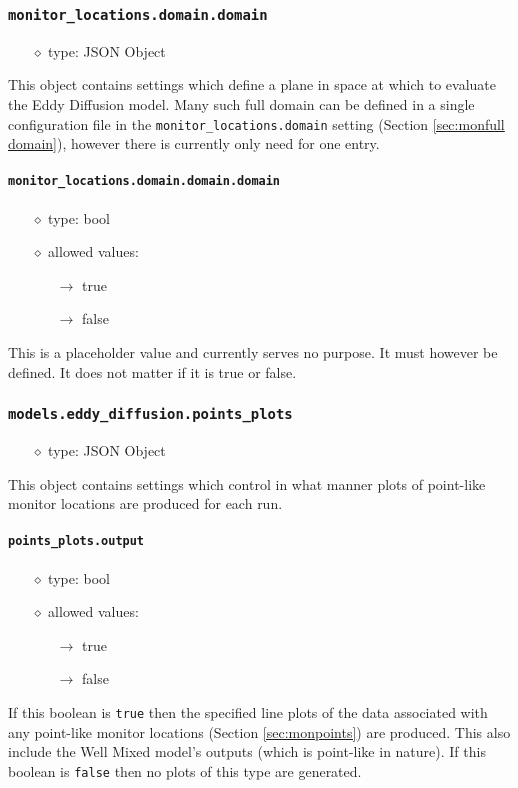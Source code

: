 \documentclass[]{article}
\def\code#1{\texttt{#1}}
\begin{document}
\subsubsection{\code{monitor\_locations.domain.domain}}
\begin{itemize}
    \item[$\diamond$] type: JSON Object 
\end{itemize}
This object contains settings which define a plane in space at which to evaluate
the Eddy Diffusion model. Many such full domain can be defined in a single
configuration file in the \code{monitor\_locations.domain} setting (Section
\ref{sec:monfull domain}), however there is currently only need for one entry.


\paragraph{\code{monitor\_locations.domain.domain.domain}}
\begin{itemize}
    \item[$\diamond$] type: bool 
    \item[$\diamond$] allowed values:
    \begin{itemize}
        \item[$\rightarrow$] true
        \item[$\rightarrow$] false
    \end{itemize}
\end{itemize}
This is a placeholder value and currently serves no purpose. It must however be
defined. It does not matter if it is true or false.

\subsubsection{\code{models.eddy\_diffusion.points\_plots}}
\begin{itemize}
    \item[$\diamond$] type: JSON Object 
\end{itemize}
This object contains settings which control in what manner plots of point-like
monitor locations are produced for each run. 

\paragraph{\code{points\_plots.output}}
\begin{itemize}
    \item[$\diamond$] type: bool 
    \item[$\diamond$] allowed values:
    \begin{itemize}
        \item[$\rightarrow$] true
        \item[$\rightarrow$] false
    \end{itemize}
\end{itemize}
If this boolean is \code{true} then the specified line plots of the data
associated with any point-like monitor locations (Section \ref{sec:monpoints})
are produced. This also include the Well Mixed model's outputs (which is
point-like in nature). If this boolean is \code{false} then no plots of this
type are generated.
\end{document}
